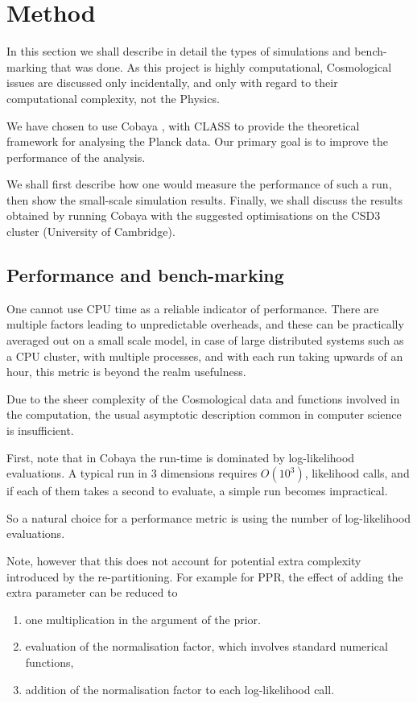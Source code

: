 \documentclass[usenatbib]{mnras}
\begin{document}
\section{Method}
\label{sec:orgfebca30}
In this section we shall describe in detail the types of simulations
and bench-marking that was done. As this project is highly
computational, Cosmological issues are discussed only incidentally,
and only with regard to their computational complexity, not the
Physics.

We have chosen to use Cobaya \citep{cobaya}, with CLASS to provide the
theoretical framework for analysing the Planck \citep{Planck}
data. Our primary goal is to improve the performance of the
analysis.

We shall first describe how one would measure the performance of
such a run, then show the small-scale simulation results. Finally,
we shall discuss the results obtained by running Cobaya with the
suggested optimisations on the CSD3 cluster (University of Cambridge).


\subsection{Performance and bench-marking}
\label{sec:org01618af}
One cannot use CPU time as a reliable indicator of
performance. There are multiple factors leading to unpredictable
overheads, and these can be practically averaged out on a small
scale model, in case of large distributed systems such as a CPU
cluster, with multiple processes, and with each run taking upwards
of an hour, this metric is beyond the realm usefulness.

Due to the sheer complexity of the Cosmological data and functions
involved in the computation, the usual asymptotic description
common in computer science is insufficient. 

First, note that in Cobaya  the run-time is dominated
by log-likelihood evaluations. A typical run in 3 dimensions
requires \(O(10^{3})\), likelihood calls, and if each of them takes a
second to evaluate, a simple run becomes impractical. 

So a natural choice for a performance metric is using the number of
log-likelihood evaluations. 

Note, however that this does not account for potential extra
complexity introduced by the re-partitioning. For example for PPR,
the effect of adding the extra parameter can be reduced to
\begin{enumerate}
\item one multiplication in the argument of the prior.
\item evaluation of the normalisation factor, which involves standard
numerical functions,
\item addition of the normalisation factor to each log-likelihood call.
\end{enumerate}
\end{document}
